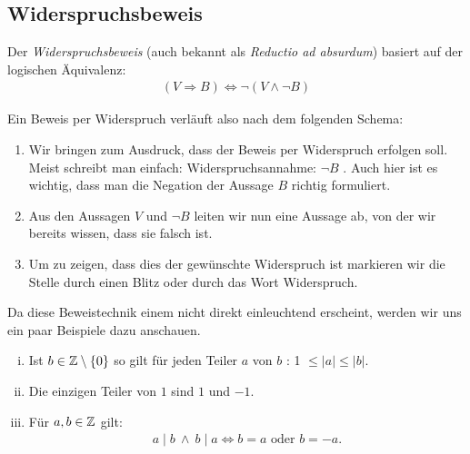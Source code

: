 \subsection{Widerspruchsbeweis} %

Der \textit{Widerspruchsbeweis} (auch bekannt als \textit{Reductio ad absurdum}) basiert auf der logischen Äquivalenz: 
\begin{align*}
    (V \Rightarrow B) \iff \neg (V \wedge \neg B)
\end{align*}

Ein Beweis per Widerspruch verläuft also nach dem folgenden Schema: 
\begin{enumerate}
    \item 
    Wir bringen zum Ausdruck, dass der Beweis per Widerspruch erfolgen soll. Meist schreibt man einfach: \glqq Widerspruchsannahme: $\neg B$ \grqq. 
    Auch hier ist es wichtig, dass man die Negation der Aussage $B$ richtig formuliert. 
    \item 
    Aus den Aussagen $V$ und $\neg B$ leiten wir nun eine Aussage ab, von der wir bereits wissen, dass sie falsch ist. 
    \item 
    Um zu zeigen, dass dies der gewünschte Widerspruch ist markieren wir die Stelle durch einen Blitz oder durch das Wort \glqq Widerspruch\grqq. 
\end{enumerate}

Da diese Beweistechnik einem nicht direkt einleuchtend erscheint, werden wir uns ein paar Beispiele dazu anschauen. 

\begin{lemma}
    \begin{enumerate}[(i)]
        \item 
        Ist $b \in \mathbb{Z} \setminus \{0\}$ so gilt für jeden Teiler $a$ von $b$ : 1 $\leq \lvert a \rvert \leq \lvert b \rvert$. 
        \item 
        Die einzigen Teiler von $1$ sind $1$ und $-1$. 
        \item 
        Für $a,b \in \mathbb{Z}$ gilt: 
        \begin{align*}
            a \mid b \ \wedge \ b \mid a \iff b = a \text{  oder } b = -a. 
        \end{align*}
    \end{enumerate}
\end{lemma}


